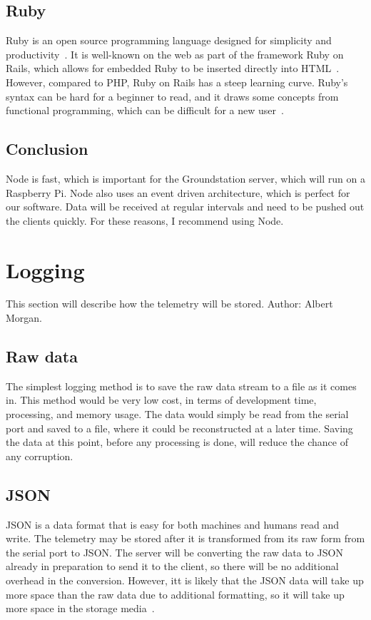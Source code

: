 \documentclass[10pt,draftclsnofoot,onecolumn]{IEEEtran}
\begin{document}
	\subsection{Ruby}
	Ruby is an open source programming language designed for simplicity and productivity~\cite{ruby}.
	It is well-known on the web as part of the framework Ruby on Rails, which allows for embedded Ruby to be inserted directly into HTML~\cite{getting-started-with-rails}.
	However, compared to PHP, Ruby on Rails has a steep learning curve.
	Ruby's syntax can be hard for a beginner to read, and it draws some concepts from functional programming, which can be difficult for a new user~\cite{ruby-on-rails-vs-php-the-good-the-bad}.	

	\subsection{Conclusion}
	Node is fast, which is important for the Groundstation server, which will run on a Raspberry Pi.
	Node also uses an event driven architecture, which is perfect for our software. Data will be received at regular intervals and need to be pushed out the clients quickly. For these reasons, I recommend using Node.


	\section{Logging}
	This section will describe how the telemetry will be stored. Author: Albert Morgan.
	\subsection{Raw data}
	The simplest logging method is to save the raw data stream to a file as it comes in.
	This method would be very low cost, in terms of development time, processing, and memory usage.
	The data would simply be read from the serial port and saved to a file, where it could be reconstructed at a later time.
	Saving the data at this point, before any processing is done, will reduce the chance of any corruption.
	
	\subsection{JSON}
	\ac{JSON} is a data format that is easy for both machines and humans read and write.
	The telemetry may be stored after it is transformed from its raw form from the serial port to \ac{JSON}.
	The server will be converting the raw data to \ac{JSON} already in preparation to send it to the client, so there will be no additional overhead in the conversion.
	However, itt is likely that the \ac{JSON} data will take up more space than the raw data due to additional formatting, so it will take up more space in the storage media~\cite{json}.
	
\end{document}
